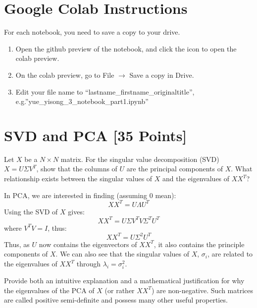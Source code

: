 \section*{Google Colab Instructions}

For each notebook, you need to save a copy to your drive.

\begin{enumerate}
	\item Open the github preview of the notebook, and click the icon to open the colab preview.
	\item On the colab preview, go to File $\rightarrow$ Save a copy in Drive.
	\item Edit your file name to “lastname_firstname_originaltitle”, e.g.”yue_yisong_3_notebook_part1.ipynb”
\end{enumerate}


\newpage
\section{SVD and PCA [35 Points]}

\problem[3] Let $X$ be a $N \times N$ matrix. For the singular value decomposition (SVD) $X = U \Sigma V^T$, show that the columns of $U$ are the principal components of $X$. What relationship exists between the singular values of $X$ and the eigenvalues of $XX^T$?

\begin{solution}
 In PCA, we are interested in finding (assuming 0 mean):
 \begin{equation}
	 XX^T = U\Lambda U^T
 \end{equation}
 Using the SVD of $X$ gives:
 \begin{equation}
	 XX^T = U\Sigma V^TV\Sigma^TU^T 
 \end{equation}
 where $V^TV=I$, thus:
 \begin{equation}
	 XX^T = U\Sigma^2U^T
 \end{equation}
 Thus, as $U$ now contains the eigenvectors of $XX^T$, it also contains the principle components of $X$. We can also see that the singular values of $X$, $\sigma_i$, are related to the eigenvalues of $XX^T$ through $\lambda_i=\sigma_i^2$.
\end{solution}

\problem[4] Provide both an intuitive explanation and a mathematical justification for why the eigenvalues of the PCA of $X$ (or rather $XX^T$) are non-negative. Such matrices are called positive semi-definite and possess many other useful properties.

